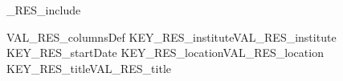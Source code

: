 %
\ifVAL_RES_include %
\begin{myTableEnv}{VAL_RES_columnsDef}%
    \myRow%
        {KEY_RES_institute}{VAL_RES_institute}%
        {KEY_RES_startDate}{}%
    \myRow%
        {KEY_RES_location}{VAL_RES_location}%
        {KEY_RES_title}{VAL_RES_title}%
\end{myTableEnv}%
%
\fi%
%